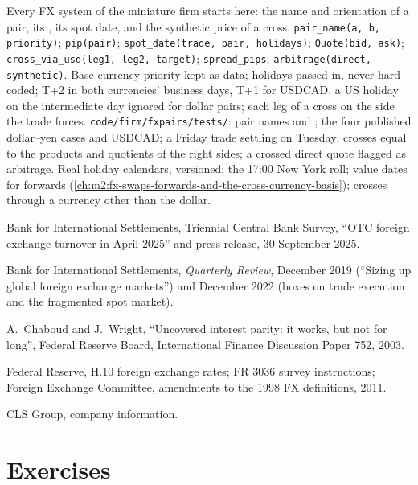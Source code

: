 \begin{build}
 Every FX system of the miniature firm starts here: the name
and orientation of a pair, its , its spot date, and the synthetic price of a
cross.
 \texttt{pair\_name(a, b, priority)}; \texttt{pip(pair)};
\texttt{spot\_date(trade, pair, holidays)}; \texttt{Quote(bid, ask)};
\texttt{cross\_via\_usd(leg1, leg2, target)}; \texttt{spread\_pips};
\texttt{arbitrage(direct, synthetic)}.
 Base-currency priority kept as data; holidays passed in, never
hard-coded; T+2 in both currencies' business days, T+1 for USDCAD, a US
holiday on the intermediate day ignored for dollar pairs; each leg of a cross
on the side the trade forces.
 \texttt{code/firm/fxpairs/tests/}: pair names and ;
the four published dollar--yen cases and USDCAD; a Friday trade settling on
Tuesday; crosses equal to the products and quotients of the right sides; a
crossed direct quote flagged as arbitrage.
 Real holiday calendars, versioned; the 17:00 New York roll;
value dates for forwards (\cref{ch:m2:fx-swaps-forwards-and-the-cross-currency-basis}); crosses through a
currency other than the dollar.
\end{build}

\begin{omsources}
\item Bank for International Settlements, Triennial Central Bank Survey,
``OTC foreign exchange turnover in April 2025'' and press release, 30 September
2025.
\item Bank for International Settlements, \emph{Quarterly Review}, December 2019
(``Sizing up global foreign exchange markets'') and December 2022 (boxes on
trade execution and the fragmented spot market).
\item A.~Chaboud and J.~Wright, ``Uncovered interest parity: it works, but not
for long'', Federal Reserve Board, International Finance Discussion Paper 752,
2003.
\item Federal Reserve, H.10 foreign exchange rates; FR 3036 survey
instructions; Foreign Exchange Committee, amendments to the 1998 FX
definitions, 2011.
\item CLS Group, company information.
\end{omsources}

\section{Exercises}

